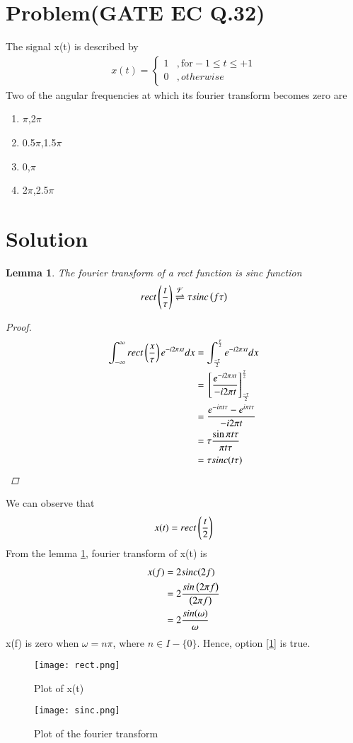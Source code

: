 \documentclass[journal,12pt,twocolumn]{IEEEtran}
\newtheorem{lemma}[theorem]{Lemma}
\begin{document}
\section{Problem(GATE EC Q.32)}
The signal x(t) is described by 
\begin{align}
 x(t)=
\begin{cases}
1 & ,\text{for} -1 \leq t \leq +1\\
0 & ,otherwise
\end{cases} 
\end{align}
Two of the angular frequencies at which its fourier transform becomes zero are 
\begin{enumerate}
\item\label{1} $\pi$,2$\pi$
\item 0.5$\pi$,1.5$\pi$
\item 0,$\pi$
\item 2$\pi$,2.5$\pi$
\end{enumerate}
\section{Solution}
\begin{lemma}\label{eq}
The fourier transform of a rect function is sinc function 
\begin{align}
    rect\left(\frac{t}{\tau}\right) \overset{\mathcal{F}}{ \rightleftharpoons} \tau sinc\left(f\tau\right)
\end{align}
\begin{proof}
\begin{align}
    \int_{-\infty}^{\infty} rect\left(\frac{x}{\tau}\right) e^{-i2\pi xt} dx&= \int_{\frac{-\tau}{2}}^{\frac{\tau}{2}} e^{-i2\pi xt}dx\\
    &={}\left[\frac{e^{-i2\pi xt}}{-i2\pi t}\right]_{\frac{-\tau}{2}}^{\frac{\tau}{2}}\\
    &=\frac{e^{-i\pi t\tau}-e^{i\pi t\tau}}{-i2\pi t}\\
    &=\tau \frac{\sin{\pi t\tau}}{\pi t\tau}\\
    &=\tau sinc(t\tau)
\end{align} 
\end{proof}
\end{lemma}
We can observe that 
\begin{align}
    x(t)=rect\left(\frac{t}{2}\right)
\end{align}
From the lemma \ref{eq}, fourier transform of x(t) is 
\begin{align}
    x(f)&= 2 sinc(2f)\\ 
        &= 2 \frac{sin\left(2\pi f\right)}{\left(2 \pi f\right)}\\
        &= 2 \frac{sin(\omega)}{\omega}
\end{align}
x(f) is zero when $\omega=n\pi$, where $n\in I-\{0\}$. Hence, option \ref{1} is true.
\begin{figure}[!h]
 \centering
 \texttt{[image: rect.png]}
 \caption{Plot of x(t)}
 \label{plot}
\end{figure}
\begin{figure}[!h]
 \centering
 \texttt{[image: sinc.png]}
 \caption{Plot of the fourier transform}
 \label{plot}
\end{figure}
\end{document}
